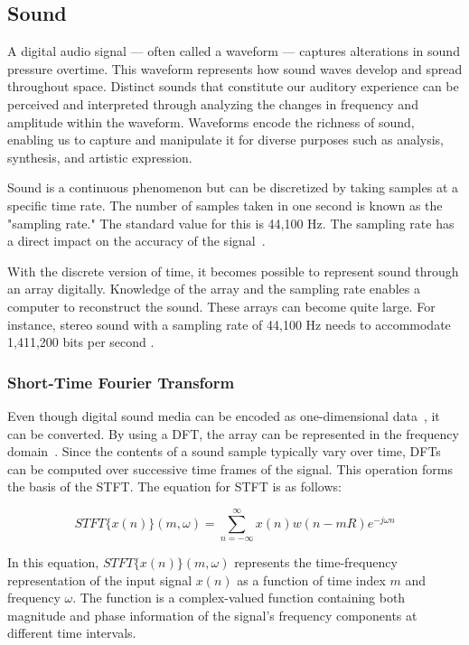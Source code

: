 \subsection{Sound} \label{sec:sound}

A digital audio signal --- often called a waveform --- captures alterations in sound pressure overtime. This waveform represents how sound waves develop and spread throughout space. Distinct sounds that constitute our auditory experience can be perceived and interpreted through analyzing the changes in frequency and amplitude within the waveform. Waveforms encode the richness of sound, enabling us to capture and manipulate it for diverse purposes such as analysis, synthesis, and artistic expression.

Sound is a continuous phenomenon but can be discretized by taking samples at a specific time rate. The number of samples taken in one second is known as the "sampling rate." The standard value for this is 44,100 Hz. The sampling rate has a direct impact on the accuracy of the signal~\cite{elsea_basics_1996}.

With the discrete version of time, it becomes possible to represent sound through an array digitally. Knowledge of the array and the sampling rate enables a computer to reconstruct the sound. These arrays can become quite large. For instance, stereo sound with a sampling rate of 44,100 \ac{Hz} needs to accommodate 1,411,200 bits per second \cite{elsea_basics_1996}.

\subsubsection{Short-Time Fourier Transform} \label{sec:stft}

Even though digital sound media can be encoded as one-dimensional data~\cite{oord_wavenet_2016}, it can be converted. By using a \acf{DFT}, the array can be represented in the frequency domain~\cite{benois-pineau_deep_2021}. Since the contents of a sound sample typically vary over time, \acp{DFT} can be computed over successive time frames of the signal. This operation forms the basis of the \acf{STFT}. The equation for \ac{STFT} is as follows:

\begin{equation} \label{eq:stft}
    STFT\{x(n)\}(m, \omega) = \sum_{n=-\infty}^{\infty} x(n) w(n - mR) e^{-j\omega n}
\end{equation}

In this equation, $STFT\{x(n)\}(m, \omega)$ represents the time-frequency representation of the input signal $x(n)$ as a function of time index $m$ and frequency $\omega$. The function is a complex-valued function containing both magnitude and phase information of the signal's frequency components at different time intervals.

